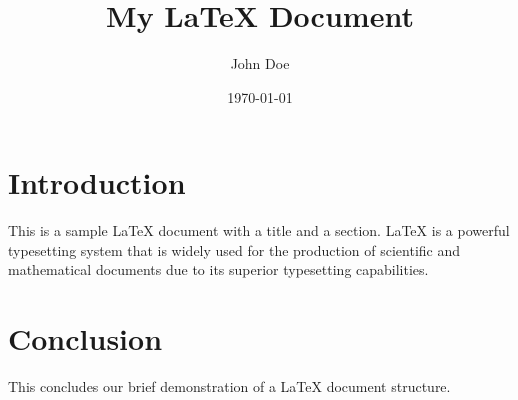 \documentclass{article}
\title{My LaTeX Document}
\author{John Doe}
\date{\today}
\begin{document}
\maketitle

\section{Introduction}
This is a sample LaTeX document with a title and a section. LaTeX is a powerful typesetting system that is widely used for the production of scientific and mathematical documents due to its superior typesetting capabilities.

\section{Conclusion}
This concludes our brief demonstration of a LaTeX document structure.
\end{document}
